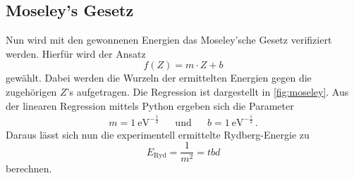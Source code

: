 \subsection{Moseley's Gesetz}
Nun wird mit den gewonnenen Energien das Moseley'sche Gesetz verifiziert werden.
Hierfür wird der Ansatz
\begin{equation*}
  f(Z) = m \cdot Z + b
\end{equation*}
gewählt. Dabei werden die Wurzeln der ermittelten Energien gegen die zugehörigen $Z$'s aufgetragen.
Die Regression ist dargestellt in \autoref{fig:moseley}.
Aus der linearen Regression mittels Python ergeben sich die Parameter
\begin{align*}
  m = \qty{1}{\eV}^{-\frac{1}{2}} && \text{und} && b  = \qty{1}{\eV}^{-\frac{1}{2}} \, .
\end{align*}
Daraus lässt sich nun die experimentell ermittelte Rydberg-Energie zu
\begin{equation*}
  E_\text{Ryd} = \frac{1}{m^2} = tbd
\end{equation*}
berechnen.


